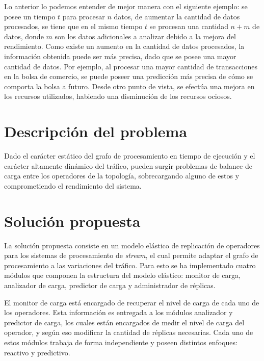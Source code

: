 Lo anterior lo podemos entender de mejor manera con el siguiente ejemplo: se posee un tiempo $t$ para procesar $n$ datos, de aumentar la cantidad de datos procesados, se tiene que en el mismo tiempo $t$ se procesan una cantidad $n+m$ de datos, donde $m$ son los datos adicionales a analizar debido a la mejora del rendimiento. Como existe un aumento en la cantidad de datos procesados, la información obtenida puede ser más precisa, dado que se posee una mayor cantidad de datos. Por ejemplo, al procesar una mayor cantidad de transacciones en la bolsa de comercio, se puede poseer una predicción más precisa de cómo se comporta la bolsa a futuro. Desde otro punto de vista, se efectúa una mejora en los recursos utilizados, habiendo una disminución de los recursos ociosos.

\section{Descripción del problema}
\label{intro:problema}


Dado el carácter estático del grafo de procesamiento en tiempo de ejecución y el carácter altamente dinámico del tráfico, pueden surgir problemas de balance de carga entre los operadores de la topología, sobrecargando alguno de estos y comprometiendo el rendimiento del sistema.

\section{Solución propuesta}
\label{intro:solucion}

La solución propuesta consiste en un modelo elástico de replicación de operadores para los sistemas de procesamiento de \textit{stream}, el cual permite adaptar el grafo de procesamiento a las variaciones del tráfico. Para esto se ha implementado cuatro módulos que componen la estructura del modelo elástico: monitor de carga, analizador de carga, predictor de carga y administrador de réplicas.

El monitor de carga está encargado de recuperar el nivel de carga de cada uno de los operadores. Esta información es entregada a los módulos analizador y predictor de carga, los cuales están encargados de medir el nivel de carga del operador, y según eso modificar la cantidad de réplicas necesarias. Cada uno de estos módulos trabaja de forma independiente y poseen distintos enfoques: reactivo y predictivo.

